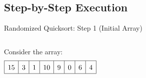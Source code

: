 \subsection{Step-by-Step Execution}
\begin{frame}{Randomized Quicksort: Step 1 (Initial Array)}
  \begin{columns}[t]
    Consider the array:
    \[
      \renewcommand{\arraystretch}{1.5}
      \begin{array}{|c|c|c|c|c|c|c|c|}
        \hline
        15 & 3 & 1 & 10 & 9 & 0 & 6 & 4 \\
        \hline
      \end{array}
    \]
  \end{columns}
\end{frame}

